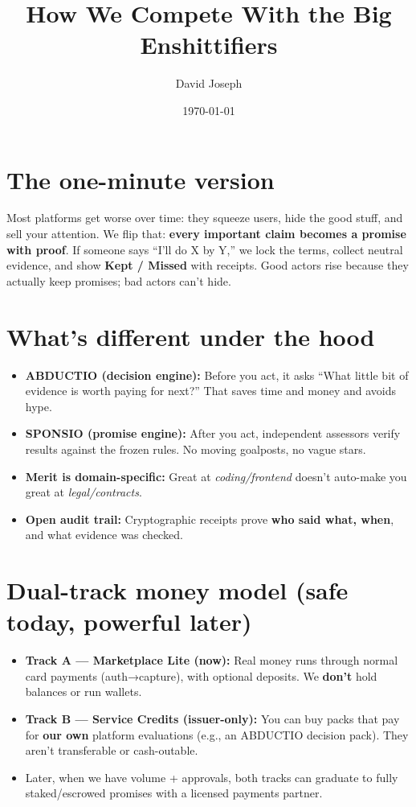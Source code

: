 \documentclass[11pt]{article}
\author{David Joseph}
\date{\today}
\title{How We Compete With the Big Enshittifiers}
\begin{document}
\maketitle
\section*{The one-minute version}
\label{sec:org4df8a0a}
Most platforms get worse over time: they squeeze users, hide the good stuff, and sell your attention.  
We flip that: \textbf{every important claim becomes a promise with proof}. If someone says “I’ll do X by Y,”
we lock the terms, collect neutral evidence, and show \textbf{Kept / Missed} with receipts.
Good actors rise because they actually keep promises; bad actors can’t hide.
\section*{What’s different under the hood}
\label{sec:orgab462b4}
\begin{itemize}
\item \textbf{\textbf{ABDUCTIO (decision engine):}} Before you act, it asks “What little bit of evidence is worth paying for next?”
That saves time and money and avoids hype.
\item \textbf{\textbf{SPONSIO (promise engine):}} After you act, independent assessors verify results against the frozen rules.
No moving goalposts, no vague stars.
\item \textbf{\textbf{Merit is domain-specific:}} Great at \emph{coding/frontend} doesn’t auto-make you great at \emph{legal/contracts}.
\item \textbf{\textbf{Open audit trail:}} Cryptographic receipts prove \textbf{who said what, when}, and what evidence was checked.
\end{itemize}
\section*{Dual-track money model (safe today, powerful later)}
\label{sec:org26b72f8}
\begin{itemize}
\item \textbf{\textbf{Track A — Marketplace Lite (now):}} Real money runs through normal card payments (auth→capture),
with optional deposits. We \textbf{don’t} hold balances or run wallets.
\item \textbf{\textbf{Track B — Service Credits (issuer-only):}} You can buy packs that pay for \textbf{our own} platform evaluations
(e.g., an ABDUCTIO decision pack). They aren’t transferable or cash-outable.
\item Later, when we have volume + approvals, both tracks can graduate to fully staked/escrowed promises
with a licensed payments partner.
\end{itemize}
\end{document}
